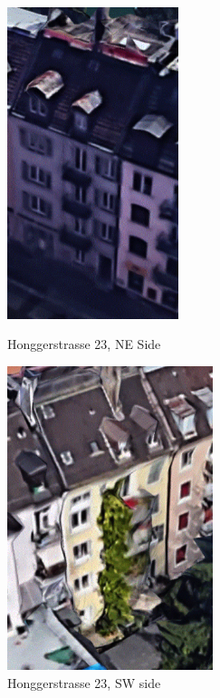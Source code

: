 \documentclass[a4paper, oneside]{discothesis}
\begin{document}
		\begin{figure}[htbp]
		\centering
		\begin{minipage}[t]{0.48\textwidth}
		\centering
		\includegraphics[width=5cm]{Hongg_photo1.pdf}
		\caption{Honggerstrasse 23, NE Side}
		\label{fig:hongg_NE}
		\end{minipage}
		\begin{minipage}[t]{0.48\textwidth}
		\centering
		\includegraphics[width=6cm]{Hongg_photo0.pdf}
		\caption{Honggerstrasse 23, SW side}
		\label{fig:hongg_SW}
		\end{minipage}
		\end{figure}
\end{document}
